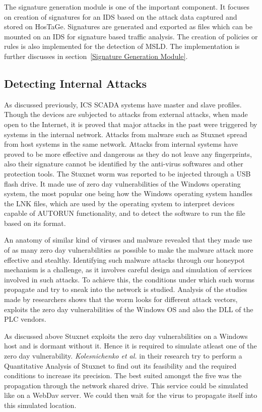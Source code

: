 \documentclass[article,msc=informatik,type=msc,colorback,accentcolor=tud9c]{tudthesis}
\begin{document}
	
	The signature generation module is one of the important component. It focuses on creation of signatures for an IDS based on the attack data captured and stored on HosTaGe. Signatures are generated and exported as files which can be mounted on an IDS for signature based traffic analysis. The creation of policies or rules is also implemented for the detection of \ac{MSLD}. The implementation is further discusses in section~\ref{Signature Generation Module}.
	
 
	\subsection {Detecting Internal Attacks}\label{Detecting Internal Attacks}

	As discussed previously, \ac{ICS} \ac{SCADA} systems have master and slave profiles. Though the devices are subjected to attacks from external attacks, when made open to the Internet, it is proved that major attacks in the past were triggered by systems in the internal network. Attacks from malware such as Stuxnet spread from host systems in the same network. Attacks from internal systems have proved to be more effective and dangerous as they do not leave any fingerprints, also their signature cannot be identified by the anti-virus softwares and other protection tools. The Stuxnet worm was reported to be injected through a USB flash drive. It made use of zero day vulnerabilities of the Windows operating system, the most popular one being how the Windows operating system handles the LNK \cite{matrosov2010stuxnet} files, which are used by the operating system to interpret devices capable of AUTORUN functionality, and to detect the software to run the file based on its format. 

	An anatomy of similar kind of viruses and malware revealed that they made use of as many zero day vulnerabilities as possible to make the malware attack more effective and stealthy. Identifying such malware attacks through our honeypot mechanism is a challenge, as it involves careful design and simulation of services involved in such attacks. To achieve this, the conditions under which such worms propagate and try to sneak into the network is studied. Analysis of the studies made by researchers \cite{Langner:2011:SDC:1990763.1990881} shows that the worm looks for different attack vectors, exploits the zero day vulnerabilities of the Windows \ac{OS} and also the \ac{DLL} of the \ac{PLC} vendors.  


	As discussed above Stuxnet exploits the zero day vulnerabilities on a Windows host and is dormant without it. Hence it is required to simulate atleast one of the zero day vulnerability. \textit{Kolesnichenko et al.} \cite{kolesnichenko2011quantitative} in their research try to perform a Quantitative Analysis of Stuxnet to find out its feasibility and the required conditions to increase its precision. The best suited amongst the five was the propagation through the network shared drive. This service could be simulated like on a WebDav server. We could then wait for the virus to propagate itself into this simulated location. 
 
\end{document}
